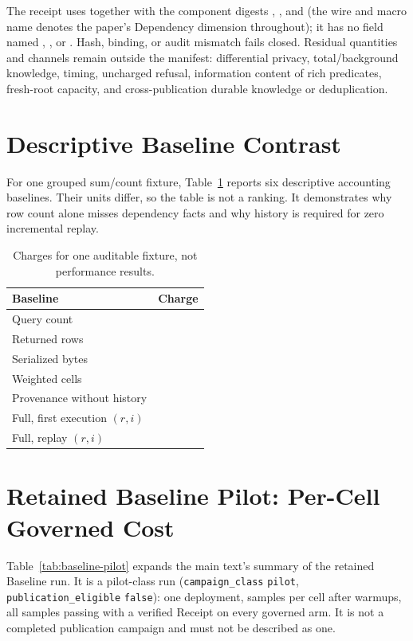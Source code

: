 \documentclass[journal,onecolumn]{IEEEtran}
\newcommand{\code}[1]{\texttt{\detokenize{#1}}}
\begin{document}
The receipt uses  together with the component
digests , , and
 (the wire and macro name \code{influence}
denotes the paper's Dependency dimension throughout); it has no field named
, , or
.
Hash, binding, or audit mismatch fails closed. Residual quantities and channels
remain outside the manifest: differential privacy, total/background knowledge,
timing, uncharged refusal, information content of
rich predicates, fresh-root capacity, and cross-publication durable knowledge
or deduplication.

\section{Descriptive Baseline Contrast}

For one grouped sum/count fixture, Table~\ref{tab:baselines} reports six
descriptive accounting baselines. Their units differ, so the table is not a
ranking. It demonstrates why row count alone misses dependency facts and why
history is required for zero incremental replay.

\begin{table}[t]
\centering
\caption{Charges for one auditable fixture, not performance results.}
\label{tab:baselines}
\small
\begin{tabular}{lr}
\toprule
Baseline & Charge \\
\midrule
Query count & \BaseQueryCount{} \\
Returned rows & \BaseRows{} \\
Serialized bytes & \BaseBytes{} \\
Weighted cells & \BaseCells{} \\
Provenance without history & \BaseNoHistory{} \\
Full, first execution $(r,i)$ & \BaseFirst{} \\
Full, replay $(r,i)$ & \BaseReplay{} \\
\bottomrule
\end{tabular}
\end{table}


\section{Retained Baseline Pilot: Per-Cell Governed Cost}
\label{sec:baseline-pilot-supp}

Table~\ref{tab:baseline-pilot} expands the main text's summary of the retained
Baseline run. It is a pilot-class run (\texttt{campaign\_class} \texttt{pilot},
\texttt{publication\_eligible} \texttt{false}): one deployment,
\FinalVFivePilotBaselinePerCell{} samples per cell after warmups, all
\FinalVFivePilotBaselineSamples{} samples passing with a verified Receipt on
every governed arm. It is not a completed publication campaign and must not be
described as one.
\end{document}

